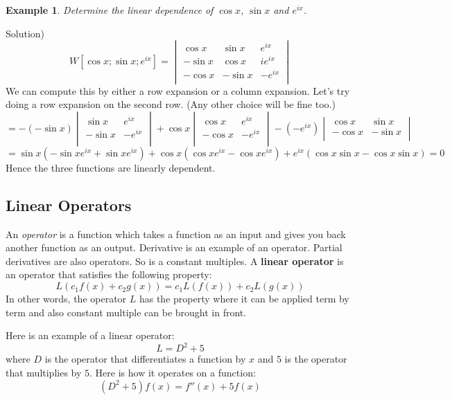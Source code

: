 \documentclass[12pt]{report}
\newtheorem{ex}{Example}[section]
\begin{document}
\begin{ex}
Determine the linear dependence of $\cos x$, $\sin x$ and $e^{ix}$.
\end{ex}
Solution)
$$W[\cos x; \sin x; e^{ix}] = \begin{vmatrix} \cos x & \sin x & e^{ix}\\ -\sin x & \cos x & ie^{ix} \\ -\cos x & -\sin x & -e^{ix} \\ \end{vmatrix}$$
We can compute this by either a row expansion or a column expansion. Let's try doing a row expansion on the second row. (Any other choice will be fine too.)
$$ = -(-\sin x) \begin{vmatrix} \sin x & e^{ix} \\ -\sin x & -e^{ix} \\ \end{vmatrix} + \cos x \begin{vmatrix} \cos x & e^{ix} \\ -\cos x & -e^{ix} \\ \end{vmatrix} - \left(-e^{ix}\right) \begin{vmatrix} \cos x & \sin x \\ -\cos x & -\sin x \\ \end{vmatrix} $$
$$ = \sin x (-\sin x e^{ix}+\sin x e^{ix}) +\cos x ( \cos x  e^{ix} - \cos x  e^{ix}) + e^{ix} ( \cos x \sin x -\cos x \sin x) =0$$
Hence the three functions are linearly dependent.

\subsection*{ Linear Operators}
An \textit{operator} is a function which takes a function as an input and gives you back another function as an output. Derivative is an example of an operator. Partial derivatives are also operators. So is a constant multiples.
A \textbf{linear operator} is an operator that satisfies the following property:
$$L( c_1 f(x) + c_2 g(x)) = c_1 L(f(x)) + c_2 L(g(x))$$
In other words, the operator $L$ has the property where it can be applied term by term and also constant multiple can be brought in front.

Here is an example of a linear operator:
$$L = D^2+5 $$
where $D$ is the operator that differentiates a function by $x$ and $5$ is the operator that multiplies by $5$. Here is how it operates on a function:
$$(D^2+5) f(x) = f''(x) + 5f(x)$$
\end{document}
